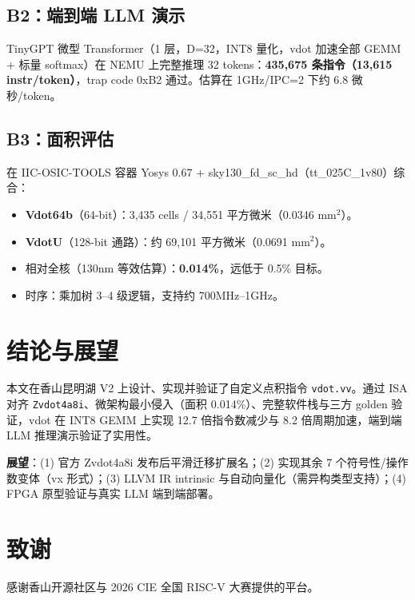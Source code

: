 \documentclass[11pt]{article}
\begin{document}
\subsection{B2：端到端 LLM 演示}
TinyGPT 微型 Transformer（1 层，D=32，INT8 量化，vdot 加速全部 GEMM + 标量 softmax）在 NEMU 上完整推理 32 tokens：\textbf{435,675 条指令（13,615 instr/token）}，trap code 0xB2 通过。估算在 1GHz/IPC=2 下约 6.8 微秒/token。

\subsection{B3：面积评估}
在 IIC-OSIC-TOOLS 容器 Yosys 0.67 + sky130\_fd\_sc\_hd（tt\_025C\_1v80）综合：
\begin{itemize}
  \item \textbf{Vdot64b}（64-bit）：3,435 cells / 34,551 平方微米（0.0346 mm$^2$）。
  \item \textbf{VdotU}（128-bit 通路）：约 69,101 平方微米（0.0691 mm$^2$）。
  \item 相对全核（130nm 等效估算）：\textbf{0.014\%}，远低于 0.5\% 目标。
  \item 时序：乘加树 3--4 级逻辑，支持约 700MHz--1GHz。
\end{itemize}

\section{结论与展望}
本文在香山昆明湖 V2 上设计、实现并验证了自定义点积指令 \texttt{vdot.vv}。通过 ISA 对齐 \texttt{Zvdot4a8i}、微架构最小侵入（面积 0.014\%）、完整软件栈与三方 golden 验证，vdot 在 INT8 GEMM 上实现 12.7 倍指令数减少与 8.2 倍周期加速，端到端 LLM 推理演示验证了实用性。

\textbf{展望}：(1) 官方 Zvdot4a8i 发布后平滑迁移扩展名；(2) 实现其余 7 个符号性/操作数变体（vx 形式）；(3) LLVM IR intrinsic 与自动向量化（需异构类型支持）；(4) FPGA 原型验证与真实 LLM 端到端部署。

\section*{致谢}
感谢香山开源社区与 2026 CIE 全国 RISC-V 大赛提供的平台。
\end{document}
